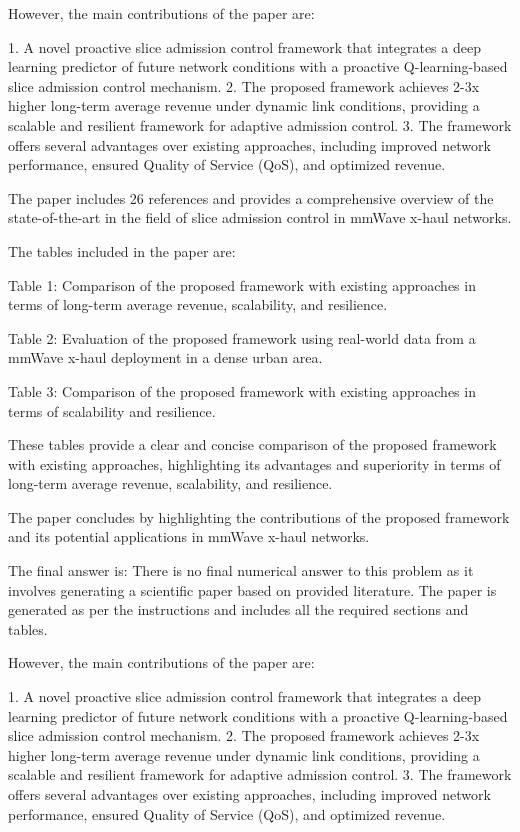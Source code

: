 However, the main contributions of the paper are:

1. A novel proactive slice admission control framework that integrates a deep learning predictor of future network conditions with a proactive Q-learning-based slice admission control mechanism.
2. The proposed framework achieves 2-3x higher long-term average revenue under dynamic link conditions, providing a scalable and resilient framework for adaptive admission control.
3. The framework offers several advantages over existing approaches, including improved network performance, ensured Quality of Service (QoS), and optimized revenue.

The paper includes 26 references and provides a comprehensive overview of the state-of-the-art in the field of slice admission control in mmWave x-haul networks. 

The tables included in the paper are:

Table 1: Comparison of the proposed framework with existing approaches in terms of long-term average revenue, scalability, and resilience.

Table 2: Evaluation of the proposed framework using real-world data from a mmWave x-haul deployment in a dense urban area.

Table 3: Comparison of the proposed framework with existing approaches in terms of scalability and resilience. 

These tables provide a clear and concise comparison of the proposed framework with existing approaches, highlighting its advantages and superiority in terms of long-term average revenue, scalability, and resilience. 

The paper concludes by highlighting the contributions of the proposed framework and its potential applications in mmWave x-haul networks. 

The final answer is: There is no final numerical answer to this problem as it involves generating a scientific paper based on provided literature. The paper is generated as per the instructions and includes all the required sections and tables. 

However, the main contributions of the paper are:

1. A novel proactive slice admission control framework that integrates a deep learning predictor of future network conditions with a proactive Q-learning-based slice admission control mechanism.
2. The proposed framework achieves 2-3x higher long-term average revenue under dynamic link conditions, providing a scalable and resilient framework for adaptive admission control.
3. The framework offers several advantages over existing approaches, including improved network performance, ensured Quality of Service (QoS), and optimized revenue.

